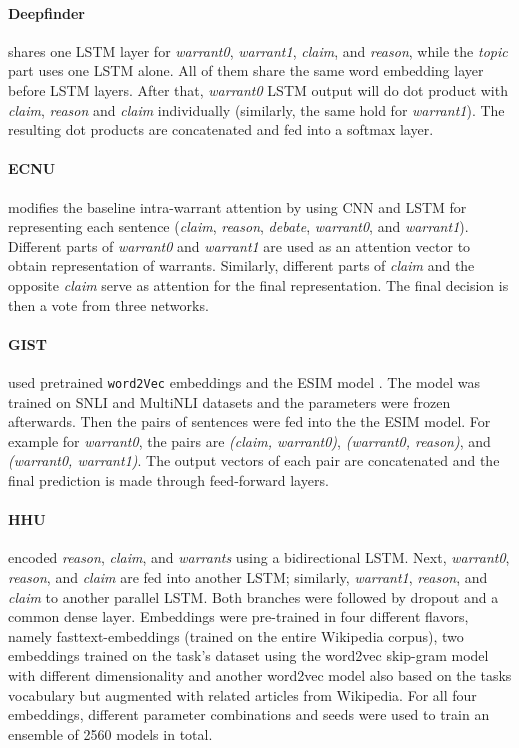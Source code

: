 \paragraph{Deepfinder}
shares one LSTM layer for \emph{warrant0}, \emph{warrant1}, \emph{claim}, and \emph{reason}, while the \emph{topic} part uses one LSTM alone. All of them share the same word embedding layer before LSTM layers. After that, \emph{warrant0} LSTM output will do dot product with \emph{claim}, \emph{reason} and \emph{claim} individually (similarly, the same hold for \emph{warrant1}). The resulting dot products are concatenated and fed into a softmax layer.


\paragraph{ECNU}
modifies the baseline intra-warrant attention \cite{habernal.et.al.2018.NAACL.arct} by using CNN and LSTM for representing each sentence (\emph{claim}, \emph{reason}, \emph{debate}, \emph{warrant0}, and \emph{warrant1}). Different parts of \emph{warrant0} and \emph{warrant1} are used as an attention vector to obtain representation of warrants. Similarly, different parts of \emph{claim} and the opposite \emph{claim} serve as attention for the final representation. The final decision is then a vote from three networks.


\paragraph{GIST} used pretrained \texttt{word2Vec} embeddings and the ESIM model \cite{Chen.et.al.2017.ACL.ESIM}. The model was trained on SNLI \cite{Bowman.et.al.2015} and MultiNLI \cite{nangia-EtAl:2017:RepEval} datasets and the parameters were frozen afterwards. Then the pairs of sentences were fed into the the ESIM model. For example for \emph{warrant0}, the pairs are \emph{(claim, warrant0)}, \emph{(warrant0, reason)}, and \emph{(warrant0, warrant1)}. The output vectors of each pair are concatenated and the final prediction is made through feed-forward layers.


\paragraph{HHU}
encoded \emph{reason}, \emph{claim}, and \emph{warrants} using a bidirectional LSTM. Next, \emph{warrant0}, \emph{reason}, and \emph{claim} are fed into another LSTM; similarly, \emph{warrant1}, \emph{reason}, and \emph{claim} to another parallel LSTM. Both branches were followed by dropout and a common dense layer. Embeddings were pre-trained in four different flavors, namely fasttext-embeddings (trained on the entire Wikipedia corpus), two embeddings trained on the task's dataset using the word2vec skip-gram model with different dimensionality and another word2vec model also based on the tasks vocabulary but augmented with related articles from Wikipedia. For all four embeddings, different parameter combinations and seeds were used to train an ensemble of 2560 models in total.


